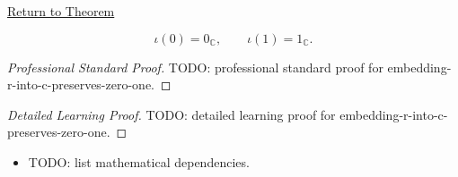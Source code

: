 \newpage
{}
\label{prf:embedding-r-into-c-preserves-zero-one}

\begin{remark*}[Return]
\hyperref[thm:embedding-r-into-c-preserves-zero-one]{Return to Theorem}
\end{remark*}

\begin{theorem*}
\[
\iota(0)=0_{\mathbb{C}},
\qquad
\iota(1)=1_{\mathbb{C}}.
\]
\end{theorem*}

\begin{proof}[Professional Standard Proof]
\LRAProofBodyStart
TODO: professional standard proof for embedding-r-into-c-preserves-zero-one.
\end{proof}

\begin{proof}[Detailed Learning Proof]
\LRAProofBodyStart
TODO: detailed learning proof for embedding-r-into-c-preserves-zero-one.
\end{proof}

\begin{remark*}
\end{remark*}

\begin{dependencies}
\begin{itemize}
  \item TODO: list mathematical dependencies.
\end{itemize}
\end{dependencies}

\clearpage
